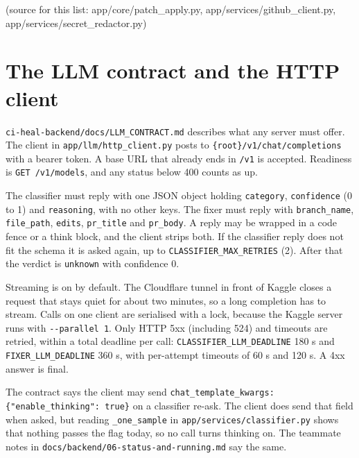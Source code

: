(source for this list: app/\allowbreak{}core/\allowbreak{}patch\_\allowbreak{}apply.py, app/\allowbreak{}services/\allowbreak{}github\_\allowbreak{}client.py, app/\allowbreak{}services/\allowbreak{}secret\_\allowbreak{}redactor.py)

\section{The LLM contract and the HTTP client}

\texttt{ci-\allowbreak{}heal-\allowbreak{}backend/\allowbreak{}docs/\allowbreak{}LLM\_\allowbreak{}CONTRACT.\allowbreak{}md} describes what any server must offer. The client in \texttt{app/\allowbreak{}llm/\allowbreak{}http\_\allowbreak{}client.\allowbreak{}py} posts to \texttt{\{root\}/\allowbreak{}v1/\allowbreak{}chat/\allowbreak{}completions} with a bearer token. A base URL that already ends in \texttt{/\allowbreak{}v1} is accepted. Readiness is \texttt{GET /\allowbreak{}v1/\allowbreak{}models}, and any status below 400 counts as up.

The classifier must reply with one JSON object holding \texttt{category}, \texttt{confidence} (0 to 1) and \texttt{reasoning}, with no other keys. The fixer must reply with \texttt{branch\_\allowbreak{}name}, \texttt{file\_\allowbreak{}path}, \texttt{edits}, \texttt{pr\_\allowbreak{}title} and \texttt{pr\_\allowbreak{}body}. A reply may be wrapped in a code fence or a think block, and the client strips both. If the classifier reply does not fit the schema it is asked again, up to \texttt{CLASSIFIER\_\allowbreak{}MAX\_\allowbreak{}RETRIES} (2). After that the verdict is \texttt{unknown} with confidence 0.

Streaming is on by default. The Cloudflare tunnel in front of Kaggle closes a request that stays quiet for about two minutes, so a long completion has to stream. Calls on one client are serialised with a lock, because the Kaggle server runs with \texttt{-\allowbreak{}-\allowbreak{}parallel 1}. Only HTTP 5xx (including 524) and timeouts are retried, within a total deadline per call: \texttt{CLASSIFIER\_\allowbreak{}LLM\_\allowbreak{}DEADLINE} 180 s and \texttt{FIXER\_\allowbreak{}LLM\_\allowbreak{}DEADLINE} 360 s, with per-attempt timeouts of 60 s and 120 s. A 4xx answer is final.

The contract says the client may send \texttt{chat\_\allowbreak{}template\_\allowbreak{}kwargs:\allowbreak{} \{"enable\_\allowbreak{}thinking":\allowbreak{} true\}} on a classifier re-ask. The client does send that field when asked, but reading \texttt{\_\allowbreak{}one\_\allowbreak{}sample} in \texttt{app/\allowbreak{}services/\allowbreak{}classifier.\allowbreak{}py} shows that nothing passes the flag today, so no call turns thinking on. The teammate notes in \texttt{docs/\allowbreak{}backend/\allowbreak{}06-\allowbreak{}status-\allowbreak{}and-\allowbreak{}running.\allowbreak{}md} say the same.


